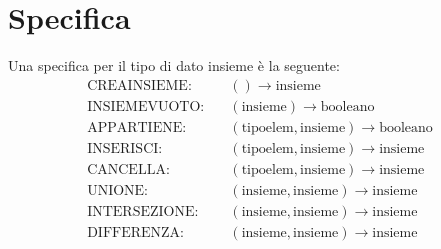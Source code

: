 \documentclass[12pt]{report}
\begin{document}
\section{Specifica}
Una specifica per il tipo di dato insieme è la seguente:
\begin{align*}
	\text{CREAINSIEME:} &\quad () \to \text{insieme} \\
	\text{INSIEMEVUOTO:} &\quad (\text{insieme}) \to \text{booleano} \\
	\text{APPARTIENE:} &\quad (\text{tipoelem}, \text{insieme}) \to \text{booleano} \\
	\text{INSERISCI:} &\quad (\text{tipoelem}, \text{insieme}) \to \text{insieme} \\
	\text{CANCELLA:} &\quad (\text{tipoelem}, \text{insieme}) \to \text{insieme} \\
	\text{UNIONE:} &\quad (\text{insieme}, \text{insieme}) \to \text{insieme}  \\
	\text{INTERSEZIONE:} &\quad (\text{insieme}, \text{insieme}) \to \text{insieme}  \\
	\text{DIFFERENZA:} &\quad (\text{insieme}, \text{insieme}) \to \text{insieme}  \\
\end{align*}
\end{document}
